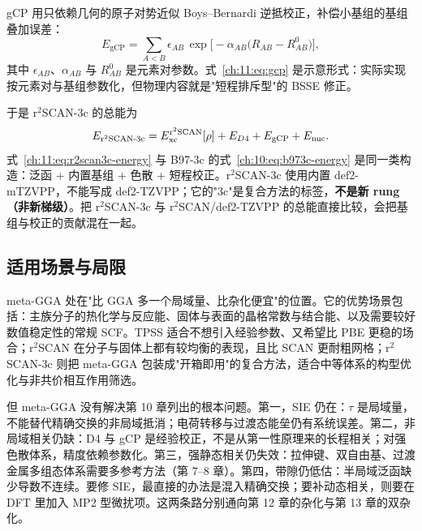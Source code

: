 gCP 用只依赖几何的原子对势近似 Boys--Bernardi 逆抵校正，补偿小基组的基组叠加误差：
\begin{equation}
E_{\mathrm{gCP}}
= \sum_{A<B}\epsilon_{AB}\,
\exp\!\big[-\alpha_{AB}\big(R_{AB}-R_{AB}^{0}\big)\big],
\label{ch:11:eq:gcp}
\end{equation}
其中 $\epsilon_{AB}$、$\alpha_{AB}$ 与 $R_{AB}^{0}$ 是元素对参数\citep{kruse2012gcp}。式~\eqref{ch:11:eq:gcp} 是示意形式：实际实现按元素对与基组参数化，但物理内容就是"短程排斥型"的 BSSE 修正。

于是 r$^2$SCAN-3c 的总能为
\begin{equation}
E_{\mathrm{r}^2\mathrm{SCAN}\text{-}\mathrm{3c}}
= E_{\mathrm{xc}}^{\mathrm{r}^2\mathrm{SCAN}}[\rho]
+ E_{D4}
+ E_{\mathrm{gCP}}
+ E_{\mathrm{nuc}} .
\label{ch:11:eq:r2scan3c-energy}
\end{equation}
式~\eqref{ch:11:eq:r2scan3c-energy} 与 B97-3c 的式~\eqref{ch:10:eq:b973c-energy} 是同一类构造：泛函 + 内置基组 + 色散 + 短程校正。r$^2$SCAN-3c 使用内置 def2-mTZVPP，不能写成 def2-TZVPP；它的"3c"是复合方法的标签，\textbf{不是新 rung（非新梯级）}。把 r$^2$SCAN-3c 与 r$^2$SCAN/def2-TZVPP 的总能直接比较，会把基组与校正的贡献混在一起。

\subsection{适用场景与局限}
\label{ch:11:sec:scope}

meta-GGA 处在"比 GGA 多一个局域量、比杂化便宜"的位置。它的优势场景包括：主族分子的热化学与反应能、固体与表面的晶格常数与结合能、以及需要较好数值稳定性的常规 SCF。TPSS 适合不想引入经验参数、又希望比 PBE 更稳的场合；r$^2$SCAN 在分子与固体上都有较均衡的表现，且比 SCAN 更耐粗网格；r$^2$SCAN-3c 则把 meta-GGA 包装成"开箱即用"的复合方法，适合中等体系的构型优化与非共价相互作用筛选。

但 meta-GGA 没有解决第 10 章列出的根本问题。第一，SIE 仍在：$\tau$ 是局域量，不能替代精确交换的非局域抵消；电荷转移与过渡态能垒仍有系统误差。第二，非局域相关仍缺：D4 与 gCP 是经验校正，不是从第一性原理来的长程相关；对强色散体系，精度依赖参数化。第三，强静态相关仍失效：拉伸键、双自由基、过渡金属多组态体系需要多参考方法（第 7--8 章）。第四，带隙仍低估：半局域泛函缺少导数不连续。要修 SIE，最直接的办法是混入精确交换；要补动态相关，则要在 DFT 里加入 MP2 型微扰项。这两条路分别通向第 12 章的杂化与第 13 章的双杂化。

